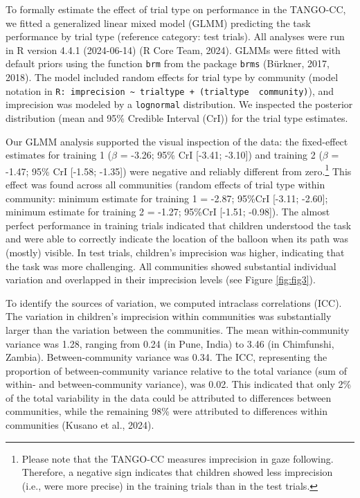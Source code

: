 \documentclass[
  man,floatsintext]{apa7}
\begin{document}
To formally estimate the effect of trial type on performance in the TANGO-CC, we fitted a generalized linear mixed model (GLMM) predicting the task performance by trial type (reference category: test trials).
All analyses were run in R version 4.4.1 (2024-06-14) (R Core Team, 2024).
GLMMs were fitted with default priors using the function \texttt{brm} from the package \texttt{brms} (Bürkner, 2017, 2018).
The model included random effects for trial type by community (model notation in \texttt{R:\ imprecision\ \textasciitilde{}\ trialtype\ +\ (trialtype\ \textbar{}\ community)}), and imprecision was modeled by a \texttt{lognormal} distribution.
We inspected the posterior distribution (mean and 95\% Credible Interval (CrI)) for the trial type estimates.

Our GLMM analysis supported the visual inspection of the data: the fixed-effect estimates for training 1 (\(\beta\) = -3.26; 95\% CrI {[}-3.41; -3.10{]}) and training 2 (\(\beta\) = -1.47; 95\% CrI {[}-1.58; -1.35{]}) were negative and reliably different from zero.\footnote{Please note that the TANGO-CC measures imprecision in gaze following.
  Therefore, a negative sign indicates that children showed less imprecision (i.e., were more precise) in the training trials than in the test trials.}
This effect was found across all communities (random effects of trial type within community: minimum estimate for training 1 = -2.87; 95\%CrI {[}-3.11; -2.60{]}; minimum estimate for training 2 = -1.27; 95\%CrI {[}-1.51; -0.98{]}).
The almost perfect performance in training trials indicated that children understood the task and were able to correctly indicate the location of the balloon when its path was (mostly) visible.
In test trials, children's imprecision was higher, indicating that the task was more challenging.
All communities showed substantial individual variation and overlapped in their imprecision levels (see Figure \ref{fig:fig3}).

To identify the sources of variation, we computed intraclass correlations (ICC).
The variation in children's imprecision within communities was substantially larger than the variation between the communities.
The mean within-community variance was 1.28, ranging from 0.24 (in Pune, India) to 3.46 (in Chimfunshi, Zambia).
Between-community variance was 0.34.
The ICC, representing the proportion of between-community variance relative to the total variance (sum of within- and between-community variance), was 0.02.
This indicated that only 2\% of the total variability in the data could be attributed to differences between communities, while the remaining 98\% were attributed to differences within communities (Kusano et al., 2024).
\end{document}

